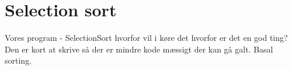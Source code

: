 \documentclass[class=report, crop=false]{standalone}
\begin{document}
    \section{Selection sort}
    Vores program -\> SelectionSort hvorfor vil i køre det hvorfor er det en god ting? Den er kort at skrive så der er mindre kode mæssigt der kan gå galt. Basal sorting.
\end{document}

